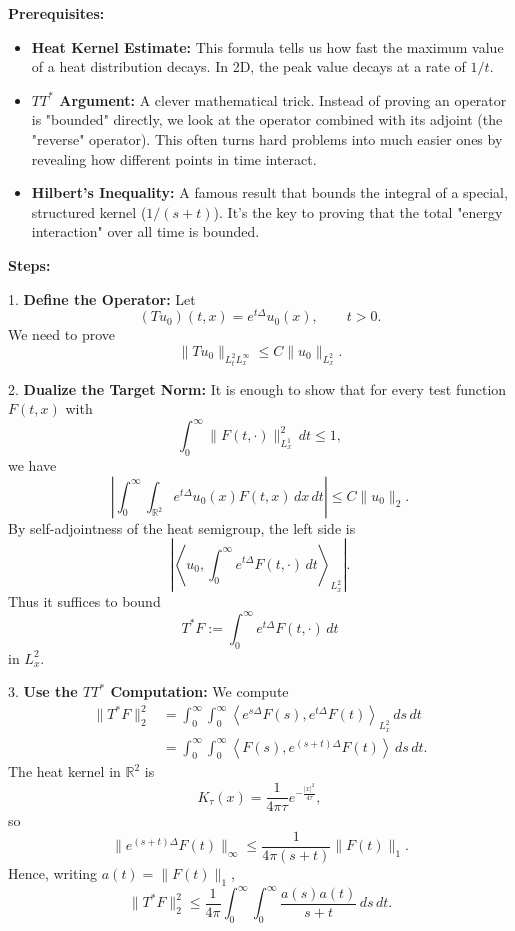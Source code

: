 \begin{solution}
\textbf{Prerequisites:}
\begin{itemize}
    \item \textbf{Heat Kernel Estimate:} This formula tells us how fast the maximum value of a heat distribution decays. In 2D, the peak value decays at a rate of $1/t$.
    \item \textbf{$TT^*$ Argument:} A clever mathematical trick. Instead of proving an operator is "bounded" directly, we look at the operator combined with its adjoint (the "reverse" operator). This often turns hard problems into much easier ones by revealing how different points in time interact.
    \item \textbf{Hilbert's Inequality:} A famous result that bounds the integral of a special, structured kernel ($1/(s+t)$). It's the key to proving that the total "energy interaction" over all time is bounded.
\end{itemize}

\textbf{Steps:}

\par\vspace{\baselineskip}
1. \textbf{Define the Operator:} Let
\[
(Tu_0)(t,x)=e^{t\Delta}u_0(x),\qquad t>0.
\]
We need to prove
\[
\|Tu_0\|_{L_t^2L_x^\infty}\leq C\|u_0\|_{L_x^2}.
\]

\par\vspace{\baselineskip}
2. \textbf{Dualize the Target Norm:} It is enough to show that for every test function $F(t,x)$ with
\[
\int_0^\infty \|F(t,\cdot)\|_{L^1_x}^2\,dt\leq1,
\]
we have
\[
\left|\int_0^\infty\int_{\mathbb{R}^2}
e^{t\Delta}u_0(x)F(t,x)\,dx\,dt\right|
\leq C\|u_0\|_2.
\]
By self-adjointness of the heat semigroup, the left side is
\[
\left|\left\langle u_0,\int_0^\infty e^{t\Delta}F(t,\cdot)\,dt\right\rangle_{L^2_x}\right|.
\]
Thus it suffices to bound
\[
T^*F:=\int_0^\infty e^{t\Delta}F(t,\cdot)\,dt
\]
in $L^2_x$.

\par\vspace{\baselineskip}
3. \textbf{Use the $TT^*$ Computation:} We compute
\[
\begin{aligned}
\|T^*F\|_2^2
&=\int_0^\infty\int_0^\infty
\left\langle e^{s\Delta}F(s),e^{t\Delta}F(t)\right\rangle_{L^2_x}\,ds\,dt\\
&=\int_0^\infty\int_0^\infty
\left\langle F(s),e^{(s+t)\Delta}F(t)\right\rangle\,ds\,dt.
\end{aligned}
\]
The heat kernel in $\mathbb{R}^2$ is
\[
K_\tau(x)=\frac{1}{4\pi\tau}e^{-\frac{|x|^2}{4\tau}},
\]
so
\[
\|e^{(s+t)\Delta}F(t)\|_\infty
\leq \frac{1}{4\pi(s+t)}\|F(t)\|_1.
\]
Hence, writing $a(t)=\|F(t)\|_1$,
\[
\|T^*F\|_2^2
\leq
\frac{1}{4\pi}
\int_0^\infty\int_0^\infty
\frac{a(s)a(t)}{s+t}\,ds\,dt.
\]


\end{solution}
